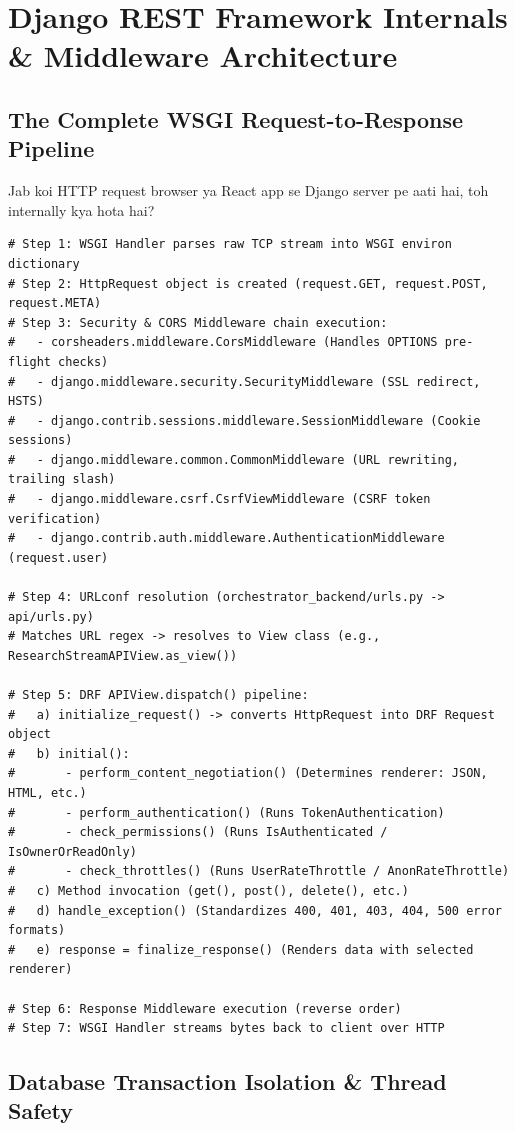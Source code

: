 \documentclass[11pt,a4paper,twoside]{report}
\begin{document}
\chapter{Django REST Framework Internals \& Middleware Architecture}

\section{The Complete WSGI Request-to-Response Pipeline}

Jab koi HTTP request browser ya React app se Django server pe aati hai, toh internally kya hota hai?

\begin{lstlisting}[style=pythonstyle,caption={Django Request Lifecycle Internals}]
# Step 1: WSGI Handler parses raw TCP stream into WSGI environ dictionary
# Step 2: HttpRequest object is created (request.GET, request.POST, request.META)
# Step 3: Security & CORS Middleware chain execution:
#   - corsheaders.middleware.CorsMiddleware (Handles OPTIONS pre-flight checks)
#   - django.middleware.security.SecurityMiddleware (SSL redirect, HSTS)
#   - django.contrib.sessions.middleware.SessionMiddleware (Cookie sessions)
#   - django.middleware.common.CommonMiddleware (URL rewriting, trailing slash)
#   - django.middleware.csrf.CsrfViewMiddleware (CSRF token verification)
#   - django.contrib.auth.middleware.AuthenticationMiddleware (request.user)

# Step 4: URLconf resolution (orchestrator_backend/urls.py -> api/urls.py)
# Matches URL regex -> resolves to View class (e.g., ResearchStreamAPIView.as_view())

# Step 5: DRF APIView.dispatch() pipeline:
#   a) initialize_request() -> converts HttpRequest into DRF Request object
#   b) initial():
#       - perform_content_negotiation() (Determines renderer: JSON, HTML, etc.)
#       - perform_authentication() (Runs TokenAuthentication)
#       - check_permissions() (Runs IsAuthenticated / IsOwnerOrReadOnly)
#       - check_throttles() (Runs UserRateThrottle / AnonRateThrottle)
#   c) Method invocation (get(), post(), delete(), etc.)
#   d) handle_exception() (Standardizes 400, 401, 403, 404, 500 error formats)
#   e) response = finalize_response() (Renders data with selected renderer)

# Step 6: Response Middleware execution (reverse order)
# Step 7: WSGI Handler streams bytes back to client over HTTP
\end{lstlisting}

\section{Database Transaction Isolation \& Thread Safety}
\end{document}
